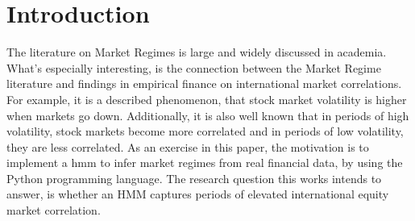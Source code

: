 \section{Introduction}
\label{sec:intro}


The literature on Market Regimes is large and widely discussed in academia. What's especially interesting, is the connection between the Market Regime literature and findings in empirical finance on international market correlations. 
For example, it is a described phenomenon, that stock market volatility is higher when markets go down. Additionally, it is also well known that in periods of high volatility, stock markets become more correlated and in periods of low volatility, they are less correlated.
As an exercise in this paper, the motivation is to implement a \gls{hmm} to infer market regimes from real financial data, by using the Python programming language. 
The research question this works intends to answer, is whether an HMM captures periods of elevated international equity market correlation.
 


